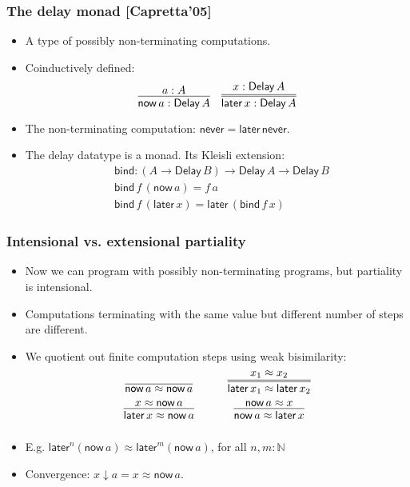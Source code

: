 \documentclass[12pt,t]{beamer}
\newcommand{\red}[1]{\textcolor{red}{#1}}
\newcommand{\Delay}{\ensuremath{\mathsf{Delay}\,}}
\newcommand{\now}{\mathsf{now}}
\newcommand{\later}{\mathsf{later}}
\newcommand{\never}{\mathsf{never}}
\newcommand{\dn}{\downarrow}
\newcommand{\bind}{\mathsf{bind}}
\begin{document}
\begin{frame}

  \frametitle{The delay monad [Capretta'05]}
  \begin{itemize}
  \item A type of possibly non-terminating computations.
  \item Coinductively defined:
    \[
    \infer{\now\,a : \Delay A}{a : A}
    \quad
    \infer={\later\,x : \Delay A}{x : \Delay A}
    \]
  \item The non-terminating computation:
    $\never = \later \,\never$.
  \item The delay datatype is a monad. Its Kleisli extension:
    \begin{align*}
      & \bind : (A \to \Delay B) \to \Delay A \to \Delay B \\
      & \bind \,f \, (\now\,a) = f\,a \\
      & \bind\,f\,(\later\,x) = \later\,(\bind\,f\,x)
    \end{align*}

  \end{itemize}
  
  
\end{frame}

\begin{frame}

  \frametitle{Intensional vs. extensional partiality}
  \begin{itemize}
  \item Now we can program with possibly non-terminating
    programs, but partiality is intensional.
  \item Computations terminating with the same value but 
    different number of steps are different.
  \item We quotient out finite computation steps using weak
    bisimilarity:
    \[
      \arraycolsep=15pt\def\arraystretch{2}
      \begin{array}{cc}
        \infer{\now\,a \approx \now\,a}{}
        &
        \infer={\later\,x_1 \approx \later\,x_2}{x_1 \approx x_2}
        \\
        \infer{\later\,x \approx \now\,a}{x \approx \now \,a}
        &
        \infer{\now\,a \approx \later\,x}{\now\,a \approx x}
      \end{array}
      \]
      \item E.g. $\later^n (\now\,a) \approx \later^m (\now\,a)$, for
        all $n,m : \mathbb{N}$
    \item Convergence: $x \dn a = x \approx \now\,a$.
  \end{itemize}
  
  
\end{frame}
\end{document}
